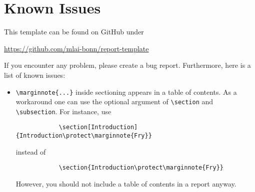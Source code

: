 \documentclass[logo]{mlai-report}
\begin{document}
	\printbibliography
	
	\appendix
	
	\section{Known Issues} 
	
	This template can be found on GitHub under 
	\begin{center}
		\url{https://github.com/mlai-bonn/report-template}
	\end{center}
	If you encounter any problem, please create a bug report. Furthermore, here is a list of known issues: 
	\begin{itemize} 
		\item \verb|\marginnote{...}| inside sectioning appears in a table of contents. As a work\-around one can use the optional argument of \verb|\section| and \verb|\subsection|. For instance, use 
		\begin{verbatim}
			\section[Introduction]{Introduction\protect\marginnote{Fry}}
		\end{verbatim}
		instead of 
		\begin{verbatim}
			\section{Introduction\protect\marginnote{Fry}}
		\end{verbatim}
		However, you should not include a table of contents in a report anyway. 
	\end{itemize}
\end{document}

